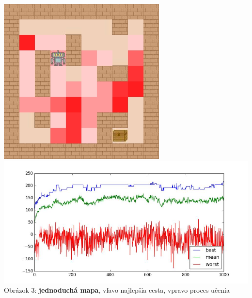 \documentclass[10pt]{paper}
\begin{document}
\begin{center}
\begin{paracol}{2}
\begin{rightcolumn}
\begin{tabular}{|ll|lll|}
\hline
\end{tabular}	

\end{rightcolumn}
\end{paracol}
\end{center}

 
\begin{center}
  \includegraphics[scale=0.4]{strategy1_simple.png} 
  \includegraphics[scale=0.3]{strategy1_simple_graph.png} \\
   Obrázok 3: \textbf{jednoduchá mapa}, vľavo najlepšia cesta, vpravo proces učenia
\end{center}
     
\end{document}
